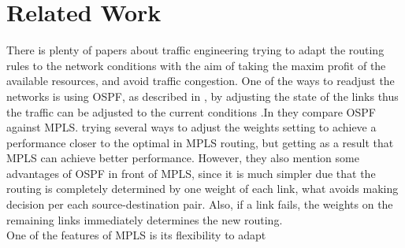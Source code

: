 \section{Related Work}
\label{sec:related}

There is plenty of papers about traffic engineering \cite{rfc3272} trying to adapt the routing rules to the network conditions with the aim of taking the maxim profit of the available resources, and avoid traffic congestion. One of the ways to readjust the networks is using OSPF, as described in \cite{rfc3630}, by adjusting the state of the links thus the traffic can be adjusted to the current conditions .In \cite{ospfW} they compare OSPF against MPLS. trying several ways to adjust the weights setting to achieve a performance closer to the optimal in MPLS routing, but getting as a result that MPLS can achieve better performance. However, they also mention some advantages of OSPF in front of MPLS, since it is much simpler due that the routing is completely determined by one weight of each link, what avoids making decision per each source-destination pair. Also, if a link fails, the weights on the remaining links immediately determines the new routing.\\

One of the features of MPLS is its flexibility to adapt 